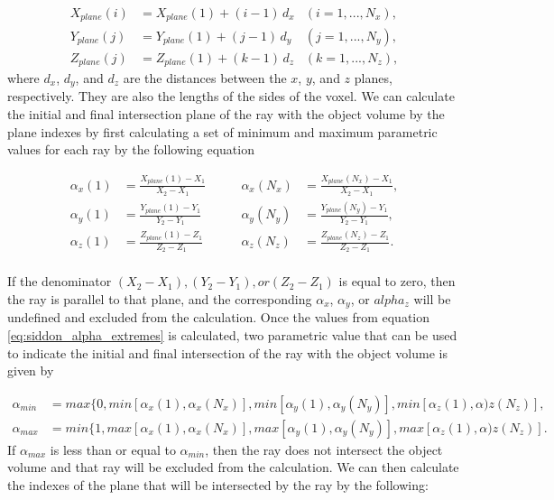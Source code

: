 \begin{equation}
	\begin{aligned}
		X_{plane}(i) & = X_{plane}(1) + (i-1)\, d_x 	&(i = 1, ..., N_x),\\ 
		Y_{plane}(j) & = Y_{plane}(1) + (j-1)\, d_y  	&(j = 1, ..., N_y),\\
		Z_{plane}(j) & = Z_{plane}(1) + (k-1)\, d_z		&(k = 1, ..., N_z),
	\end{aligned}
	\label{eq:siddon_planes}
\end{equation}
where $d_x$, $d_y$, and $d_z$ are the distances between the $x$, $y$, and $z$ planes, respectively.  They are also the lengths of the sides of the voxel.  We can calculate the initial and final intersection plane of the ray with the object volume by the plane indexes by first calculating a set of minimum and maximum parametric values for each ray by the following equation

\begin{equation}
\begin{aligned}
\alpha_x(1) &= \frac{X_{plane}(1) - X_1}{X_2 - X_1} \qquad &\alpha_x(N_x) &= \frac{X_{plane}(N_x) - X_1}{X_2 - X_1}, \\
\alpha_y(1) &= \frac{Y_{plane}(1) - Y_1}{Y_2 - Y_1} \qquad &\alpha_y(N_y) &= \frac{Y_{plane}(N_y) - Y_1}{Y_2 - Y_1}, \\
\alpha_z(1) &= \frac{Z_{plane}(1) - Z_1}{Z_2 - Z_1} \qquad &\alpha_z(N_z) &= \frac{Z_{plane}(N_z) - Z_1}{Z_2 - Z_1}. \\
\end{aligned}
\label{eq:siddon_alpha_extremes}
\end{equation}

If the denominator $(X_2 - X_1), (Y_2-Y_1), or (Z_2 - Z_1)$ is equal to zero, then the ray is parallel to that plane, and the corresponding $\alpha_x$, $\alpha_y$, or $alpha_z$ will be undefined and excluded from the calculation.  Once the values from equation \ref{eq:siddon_alpha_extremes} is calculated, two parametric value that can be used to indicate the initial and final intersection of the ray with the object volume is given by 

\begin{equation}
\begin{aligned}
\alpha_{min} &= max\{0, min \left[ \alpha_x(1), \alpha_x(N_x) \right], min \left[ \alpha_y(1), \alpha_y(N_y) \right], min \left[ \alpha_z(1), \alpha)z (N_z) \right], \\
\alpha_{max} &= min\{1, max \left[ \alpha_x(1), \alpha_x(N_x) \right], max \left[ \alpha_y(1), \alpha_y(N_y) \right], max \left[ \alpha_z(1), \alpha)z (N_z) \right].
\end{aligned}
\label{eq:siddon_alpha_min_max}
\end{equation}
If $\alpha_{max}$ is less than or equal to $\alpha_{min}$, then the ray does not intersect the object volume and that ray will be excluded from the calculation.  We can then calculate the indexes of the plane that will be intersected by the ray by the following:

